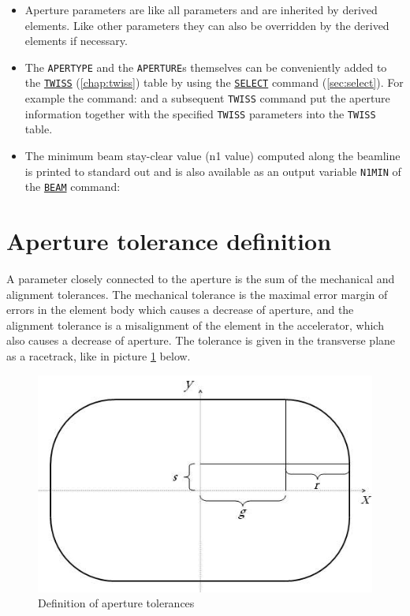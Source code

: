 \begin{itemize}
   \item  Aperture parameters are like all parameters and are inherited
     by derived elements. Like other parameters they can also be overridden by
     the derived elements if necessary.  

   \item The \texttt{APERTYPE} and the \texttt{APERTURE}s themselves can be
     conveniently added to the \hyperref[chap:twiss]{\texttt{TWISS}} 
     (\autoref{chap:twiss}) table by using the
     \hyperref[sec:select]{\texttt{SELECT}} command
     (\autoref{sec:select}). For example the command:     
     and a subsequent \texttt{TWISS} command put the aperture information together 
     with the specified \texttt{TWISS} parameters into the \texttt{TWISS} table.

   \item The minimum beam stay-clear value (n1 value) computed along the 
     beamline is printed to standard out and is also available as an output 
     variable \texttt{N1MIN} of the \hyperref[sec:beam]{\texttt{BEAM}} command: 

\end{itemize}

\section{Aperture tolerance definition}
\label{sec:apertol}
A parameter closely connected to the aperture is the sum of the
mechanical and alignment tolerances. The mechanical tolerance is 
the maximal error margin of errors in the element body which 
causes a decrease of aperture, and the alignment tolerance is a 
misalignment of the element in the accelerator, which also causes a 
decrease of aperture. The tolerance is given in the transverse plane 
as a racetrack, like in picture \ref{fig:aperture-tol} below. 

\begin{figure}[htb]
  \centering
  \includegraphics[width=250bp]{jpg/tolerance.jpg}
  \caption{Definition of aperture tolerances}
  \label{fig:aperture-tol}
\end{figure}


